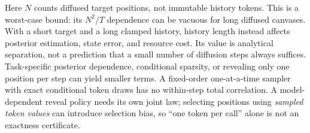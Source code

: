 \documentclass{article}
\theoremstyle{remark}\newtheorem{remark}[theorem]{Remark}
\begin{document}
Here $N$ counts diffused target positions, not immutable history tokens. This is a worst-case bound: its $N^2/T$ dependence can be vacuous for long diffused canvases. With a short target and a long clamped history, history length instead affects posterior estimation, state error, and resource cost. Its value is analytical separation, not a prediction that a small number of diffusion steps always suffices. Task-specific posterior dependence, conditional sparsity, or revealing only one position per step can yield smaller terms. A fixed-order one-at-a-time sampler with exact conditional token draws has no within-step total correlation. A model-dependent reveal policy needs its own joint law; selecting positions using \emph{sampled token values} can introduce selection bias, so ``one token per call'' alone is not an exactness certificate.
\end{document}
